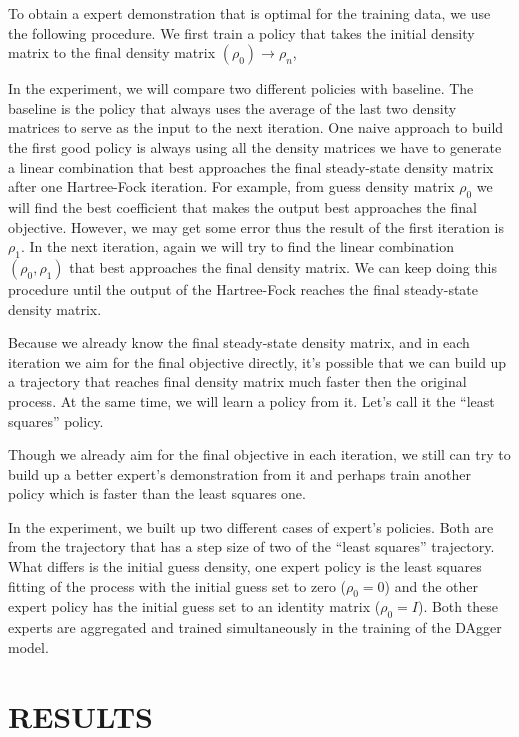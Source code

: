 \documentclass[twoside,11pt]{article}
\begin{document}
To obtain a expert demonstration that is optimal for the training data, we use the following procedure. We first train a policy that takes the initial density matrix to the final density matrix $(\rho_0) \rightarrow \rho_n$,


In the experiment, we will compare two different policies with baseline. The baseline is the policy that always uses the average of the last two density matrices to serve as the input to the next iteration.
One naive approach to build the first good policy is always using all the density matrices we have to generate a linear combination that best approaches the final steady-state density matrix after one Hartree-Fock iteration.  For example, from guess density matrix $\rho_0$ we will find the best coefficient that makes the output best approaches the final objective. However, we may get some error thus the result of the first iteration is $\rho_1$.  In the next iteration, again we will try to find the linear combination $(\rho_0, \rho_1)$ that best approaches the final density matrix. We can keep doing this procedure until the output of the Hartree-Fock reaches the final steady-state density matrix.

Because we already know the final steady-state density matrix, and in each iteration we aim for the final objective directly, it's possible that we can build up a trajectory that reaches final density matrix much faster then the original process. At the same time, we will learn a policy from it. Let's call it the ``least squares'' policy.

Though we already aim for the final objective in each iteration, we still can try to build up a better expert's demonstration from it and perhaps train another policy which is faster than the least squares one.

In the experiment, we built up two different cases of expert's policies. Both are from the trajectory that has a step size of two of the ``least squares'' trajectory. What differs is the initial guess density, one expert policy is the least squares fitting of the process with the initial guess set to zero ($\rho_0 = 0$) and the other expert policy has the initial guess set to an identity matrix ($\rho_0 = I$). Both these experts are aggregated and trained simultaneously in the training of the DAgger model. 

\section{RESULTS}
\end{document}
